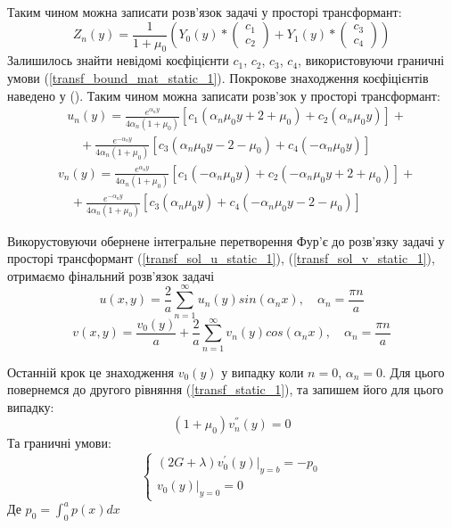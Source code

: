 Таким чином можна записати розв'язок задачі у просторі трансформант:
\begin{equation}
    Z_n(y) = \frac{1}{1 + \mu_0} \left( Y_0(y) * \begin{pmatrix} c_1 \\ c_2 \end{pmatrix} +  Y_1(y) * \begin{pmatrix} c_3 \\ c_4 \end{pmatrix}  \right)
\end{equation}
Залишилось знайти невідомі коєфіцієнти $c_1$, $c_2$, $c_3$, $c_4$, використовуючи граничні умови (\ref{transf_bound_mat_static_1}).
Покрокове знаходження коєфіцієнтів наведено у ().
Таким чином можна записати розв'зок у просторі трансформант:
\begin{align}\label{transf_sol_u_static_1}
    &u_n(y) = \frac{e^{\alpha_n y}}{4 \alpha_n (1 + \mu_0)} \left[c_1 (\alpha_n \mu_0 y + 2 + \mu_0) + c_2 (\alpha_n \mu_0 y) \right] + \nonumber \\
    &\quad + \frac{e^{-\alpha_n y}}{4 \alpha_n (1 + \mu_0)} \left[c_3 (\alpha_n \mu_0 y - 2 - \mu_0) + c_4 (-\alpha_n \mu_0 y)\right]
\end{align}
\begin{align}\label{transf_sol_v_static_1}
    &v_n(y) = \frac{e^{\alpha_n y}}{4 \alpha_n (1 + \mu_0)} \left[c_1 (-\alpha_n \mu_0 y) + c_2 (-\alpha_n \mu_0 y + 2 + \mu_0) \right] + \nonumber \\
    &\quad + \frac{e^{-\alpha_n y}}{4 \alpha_n (1 + \mu_0)} \left[c_3 (\alpha_n \mu_0 y) + c_4 (-\alpha_n \mu_0 y - 2 - \mu_0)\right]
\end{align}

Викорустовуючи обернене інтегральне перетворення Фур'є до розв'язку задачі у просторі трансформант
(\ref{transf_sol_u_static_1}), (\ref{transf_sol_v_static_1}), отримаємо фінальний розв'язок задачі
\begin{equation}
    u(x,y) = \frac{2}{a} \sum_{n=1}^{\infty} u_n(y) sin(\alpha_n x), \quad \alpha_n = \frac{\pi n}{a}
\end{equation}
\begin{equation}
    v(x,y) = \frac{v_0(y)}{a} + \frac{2}{a} \sum_{n=1}^{\infty} v_n(y) cos(\alpha_n x), \quad \alpha_n = \frac{\pi n}{a}
\end{equation}

Останній крок це знаходження $v_0(y)$ у випадку коли $n=0$, $\alpha_n =0$.
Для цього повернемся до другого рівняння (\ref{transf_static_1}), та запишем його для цього випадку:
\begin{equation}\label{transf_v_0_static_1}
    (1 + \mu_0) v_n^{''}(y) = 0
\end{equation}
Та граничні умови:
\begin{equation}\label{transf_bound_v_0_static_1}
    \begin{cases}
        (2G + \lambda)v_0^{'}(y)|_{y=b} = -p_0 \\
        v_0(y)|_{y=0} = 0
    \end{cases}
\end{equation}
Де $p_0 = \int_{0}^{a}p(x)dx$


